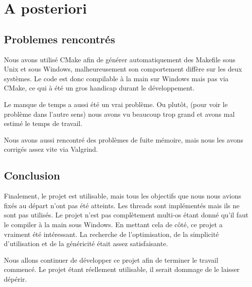 \documentclass[a4paper]{report}
\begin{document}
\chapter{A posteriori}

    \section{Problemes rencontrés}

    Nous avons utilisé CMake afin de générer automatiquement des Makefile sous Unix et sous Windows, malheureusement
    son comportement diffère sur les deux systèmes. Le code est donc compilable à la main sur Windows mais pas via CMake, ce qui à
    été un gros handicap durant le développement.

    \vspace{5mm}

    Le manque de temps a aussi été un vrai problème. Ou plutôt, (pour voir le problème dans l'autre sens) nous avons vu
	beaucoup trop grand et avons mal estimé le temps de travail.

    \vspace{5mm}

    Nous avons aussi rencontré des problèmes de fuite mémoire, mais nous les avons corrigés assez vite via Valgrind.

    \section{Conclusion}

    Finalement, le projet est utilisable, mais tous les objectifs que nous nous avions fixés au départ n'ont pas été
    atteints. Les threads sont implémentés mais ils ne sont pas utilisés. Le projet n'est pas complètement multi-os
    étant donné qu'il faut le compiler à la main sous Windows.
    En mettant cela de côté, ce projet a vraiment été intéressant. La recherche de l'optimisation, de la simplicité
    d'utilisation et de la généricité était assez satisfaisante.

    \vspace{5mm}

    Nous allons continuer de développer ce projet afin de terminer le travail commencé. Le projet étant réellement
    utilisable, il serait dommage de le laisser dépérir.

\addtolength{\textheight}{60mm}
\end{document}
